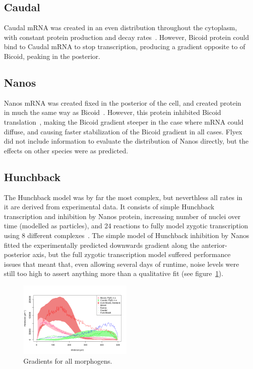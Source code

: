\documentclass[11pt,a4paper,twocolumn]{article}
\begin{document}
\subsection{Caudal}
Caudal mRNA was created in an even distribution throughout the cytoplasm, with constant protein production and decay rates~\cite{Bergmann2007}. However, Bicoid protein could bind to Caudal mRNA to stop transcription, producing a gradient opposite to of Bicoid, peaking in the posterior.

\subsection{Nanos}
Nanos mRNA was created fixed in the posterior of the cell, and created protein in much the same way as Bicoid~\cite{Kugler2009,Bergmann2007}. However, this protein inhibited Bicoid translation~\cite{Little2011}, making the Bicoid gradient steeper in the case where mRNA could diffuse, and causing faster stabilization of the Bicoid gradient in all cases. Flyex did not include information to evaluate the distribution of Nanos directly, but the effects on other species were as predicted.

\subsection{Hunchback}
The Hunchback model was by far the most complex, but neverthless all rates in it are derived from experimental data. It consists of simple Hunchback transcription and inhibition by Nanos protein, increasing number of nuclei over time (modelled as particles), and 24 reactions to fully model zygotic transcription using 8 different complexes~\cite{Holloway2011}. The simple model of Hunchback inhibition by Nanos fitted the experimentally predicted downwards gradient along the anterior-posterior axis, but the full zygotic transcription model suffered performance issues that meant that, even allowing several days of runtime, noise levels were still too high to assert anything more than a qualitative fit (see figure~\ref{fig:all}).

\begin{figure}[h]
\includegraphics[width=0.5\textwidth]{writeup-all}
\caption{Gradients for all morphogens. \label{fig:all}}
\end{figure}
\end{document}
